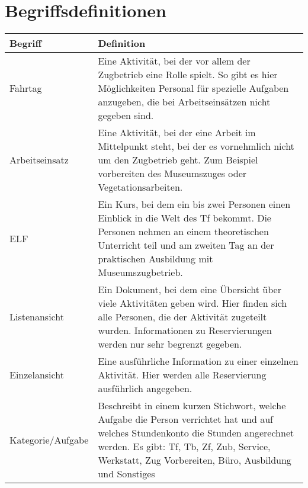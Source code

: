\chapter{Begriffsdefinitionen}\label{glossar}
\begin{tabularx}{\textwidth}{l|X}
  Begriff	& Definition \\
  \hline
  \hline
  Fahrtag	&
    Eine Aktivität, bei der vor allem der Zugbetrieb eine Rolle spielt.
    So gibt es hier Möglichkeiten Personal für spezielle Aufgaben anzugeben, die bei Arbeitseinsätzen nicht gegeben sind.\\
  \hline
  Arbeitseinsatz &
    Eine Aktivität, bei der eine Arbeit im Mittelpunkt steht, bei der es vornehmlich nicht um den Zugbetrieb geht.
    Zum Beispiel vorbereiten des Museumszuges oder Vegetationsarbeiten. \\
  \hline
  ELF &
    Ein Kurs, bei dem ein bis zwei Personen einen Einblick in die Welt des Tf bekommt.
    Die Personen nehmen an einem theoretischen Unterricht teil und am zweiten Tag an der praktischen Ausbildung mit Museumszugbetrieb.\\
  \hline
  Listenansicht &
    Ein Dokument, bei dem eine Übersicht über viele Aktivitäten geben wird.
    Hier finden sich alle Personen, die der Aktivität zugeteilt wurden.
    Informationen zu Reservierungen werden nur sehr begrenzt gegeben. \\
  \hline
  Einzelansicht &
  	Eine ausführliche Information zu einer einzelnen Aktivität.
    Hier werden alle Reservierung ausführlich angegeben. \\
  \hline
  Kategorie/Aufgabe &
  	Beschreibt in einem kurzen Stichwort, welche Aufgabe die Person verrichtet hat und auf welches Stundenkonto die Stunden angerechnet werden.
    Es gibt: Tf, Tb, Zf, Zub, Service, Werkstatt, Zug Vorbereiten, Büro, Ausbildung und Sonstiges
\end{tabularx}
